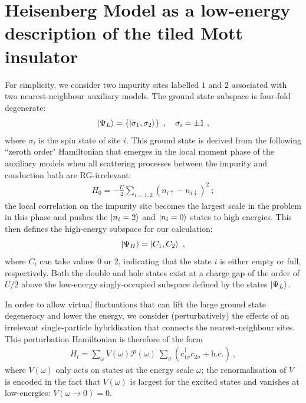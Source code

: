 \section{Heisenberg Model as a low-energy description of the tiled Mott insulator}\label{heisenbergDerivation}
For simplicity, we consider two impurity sites labelled \(1\) and \(2\) associated with two nearest-neighbour auxiliary models. The ground state subspace is four-fold degenerate:
\begin{equation}\begin{aligned}
	\ket{\Psi_L} = \left\{\ket{\sigma_1,\sigma_2}\right\}~,\quad \sigma_i = \pm 1~,
\end{aligned}\end{equation}
where \(\sigma_i\) is the spin state of site \(i\). This ground state is derived from the following ``zeroth order" Hamiltonian that emerges in the local moment phase of the auxiliary models when all scattering processes between the impurity and conduction bath are RG-irrelevant:
\begin{equation}\begin{aligned}
	H_0 = -\frac{U}{2}\sum_{i=1,2}\left(n_{i \uparrow} - n_{i \downarrow}\right)^2~;
\end{aligned}\end{equation}
the local correlation on the impurity site becomes the largest scale in the problem in this phase and pushes the \(\ket{n_i=2}\) and \(\ket{n_i=0}\) states to high energies. This then defines the high-energy subspace for our calculation:
\begin{equation}\begin{aligned}
	\ket{\Psi_H} = \ket{C_1,C_2}~,
\end{aligned}\end{equation}
where \(C_i\) can take values 0 or 2, indicating that the state \(i\) is either empty or full, respectively. Both the double and hole states exist at a charge gap of the order of \(U/2\) above the low-energy singly-occupied subspace defined by the states \(\ket{\Psi_L}\).

In order to allow virtual fluctuations that can lift the large ground state degeneracy and lower the energy, we consider (perturbatively) the effects of an irrelevant single-particle hybridisation that connects the nearest-neighbour sites. This perturbation Hamiltonian is therefore of the form
\begin{equation}\begin{aligned}
	H_t = \sum_\omega V(\omega) \mathcal{P}(\omega)~\sum_\sigma\left(c^\dagger_{1\sigma}c_{2\sigma} + \text{h.c.}\right) ~,
\end{aligned}\end{equation}
where \(V(\omega)\) only acts on states at the energy scale \(\omega\); the renormalisation of \(V\) is encoded in the fact that \(V(\omega)\) is largest for the excited states and vanishes at low-energies: \(V(\omega \to 0) = 0\).


